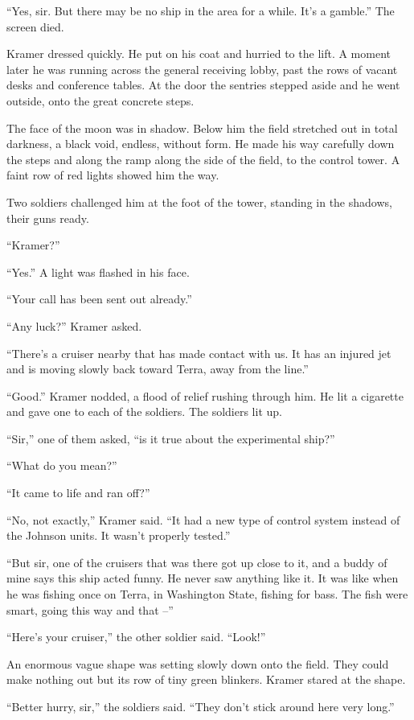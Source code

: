 \documentclass[12pt,a5paper]{book}
\begin{document}
“Yes, sir. But there may be no ship in the area for a while. It's a gamble.” The screen died.

Kramer dressed quickly. He put on his coat and hurried to the lift. A moment later he was running across the general receiving lobby, past the rows of vacant desks and conference tables. At the door the sentries stepped aside and he went outside, onto the great concrete steps.

The face of the moon was in shadow. Below him the field stretched out in total darkness, a black void, endless, without form. He made his way carefully down the steps and along the ramp along the side of the field, to the control tower. A faint row of red lights showed him the way.

Two soldiers challenged him at the foot of the tower, standing in the shadows, their guns ready.

“Kramer?”

“Yes.” A light was flashed in his face.

“Your call has been sent out already.”

“Any luck?” Kramer asked.

“There's a cruiser nearby that has made contact with us. It has an injured jet and is moving slowly back toward Terra, away from the line.”

“Good.” Kramer nodded, a flood of relief rushing through him. He lit a cigarette and gave one to each of the soldiers. The soldiers lit up.

“Sir,” one of them asked, “is it true about the experimental ship?”

“What do you mean?”

“It came to life and ran off?”

“No, not exactly,” Kramer said. “It had a new type of control system instead of the Johnson units. It wasn't properly tested.”

“But sir, one of the cruisers that was there got up close to it, and a buddy of mine says this ship acted funny. He never saw anything like it. It was like when he was fishing once on Terra, in Washington State, fishing for bass. The fish were smart, going this way and that –”

“Here's your cruiser,” the other soldier said. “Look!”

An enormous vague shape was setting slowly down onto the field. They could make nothing out but its row of tiny green blinkers. Kramer stared at the shape.

“Better hurry, sir,” the soldiers said. “They don't stick around here very long.”
\end{document}
